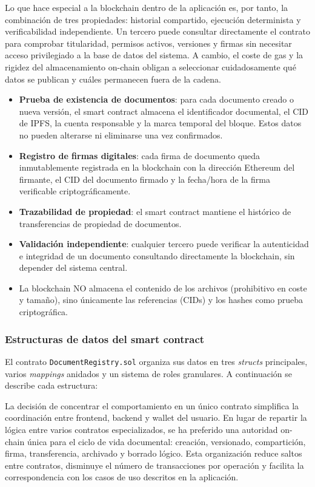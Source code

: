 \documentclass[11pt, a4paper]{article}
\begin{document}
Lo que hace especial a la blockchain dentro de la aplicación es, por tanto, la combinación de tres propiedades: historial compartido, ejecución determinista y verificabilidad independiente. Un tercero puede consultar directamente el contrato para comprobar titularidad, permisos activos, versiones y firmas sin necesitar acceso privilegiado a la base de datos del sistema. A cambio, el coste de gas y la rigidez del almacenamiento on-chain obligan a seleccionar cuidadosamente qué datos se publican y cuáles permanecen fuera de la cadena.

\begin{itemize}
    \item \textbf{Prueba de existencia de documentos}: para cada documento creado o nueva versión, el smart contract almacena el identificador documental, el CID de IPFS, la cuenta responsable y la marca temporal del bloque. Estos datos no pueden alterarse ni eliminarse una vez confirmados.
    \item \textbf{Registro de firmas digitales}: cada firma de documento queda inmutablemente registrada en la blockchain con la dirección Ethereum del firmante, el CID del documento firmado y la fecha/hora de la firma verificable criptográficamente.
    \item \textbf{Trazabilidad de propiedad}: el smart contract mantiene el histórico de transferencias de propiedad de documentos.
    \item \textbf{Validación independiente}: cualquier tercero puede verificar la autenticidad e integridad de un documento consultando directamente la blockchain, sin depender del sistema central.
    \item La blockchain NO almacena el contenido de los archivos (prohibitivo en coste y tamaño), sino únicamente las referencias (CIDs) y los hashes como prueba criptográfica.
\end{itemize}

\subsubsection{Estructuras de datos del smart contract}

El contrato \texttt{DocumentRegistry.sol} organiza sus datos en tres \textit{structs} principales, varios \textit{mappings} anidados y un sistema de roles granulares. A continuación se describe cada estructura:

La decisión de concentrar el comportamiento en un único contrato simplifica la coordinación entre frontend, backend y wallet del usuario. En lugar de repartir la lógica entre varios contratos especializados, se ha preferido una autoridad on-chain única para el ciclo de vida documental: creación, versionado, compartición, firma, transferencia, archivado y borrado lógico. Esta organización reduce saltos entre contratos, disminuye el número de transacciones por operación y facilita la correspondencia con los casos de uso descritos en la aplicación.
\end{document}
